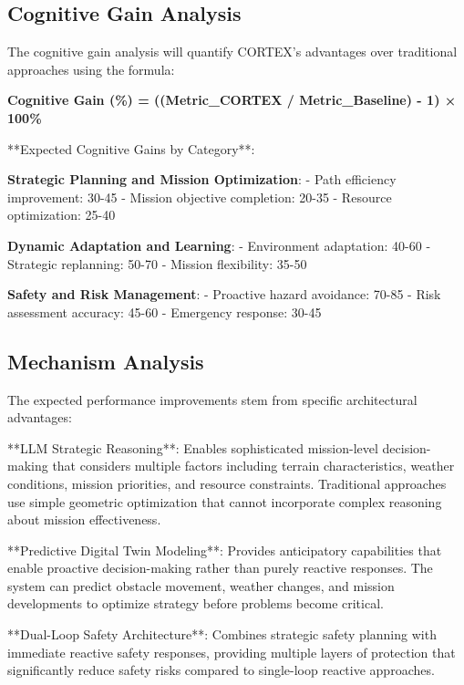 \subsection{Cognitive Gain Analysis}

The cognitive gain analysis will quantify CORTEX's advantages over traditional approaches using the formula:

\textbf{Cognitive Gain (\%) = ((Metric\_CORTEX / Metric\_Baseline) - 1) × 100\%}

**Expected Cognitive Gains by Category**:

\textbf{Strategic Planning and Mission Optimization}:
- Path efficiency improvement: 30-45%
- Mission objective completion: 20-35%
- Resource optimization: 25-40%

\textbf{Dynamic Adaptation and Learning}:
- Environment adaptation: 40-60%
- Strategic replanning: 50-70%
- Mission flexibility: 35-50%

\textbf{Safety and Risk Management}:
- Proactive hazard avoidance: 70-85%
- Risk assessment accuracy: 45-60%
- Emergency response: 30-45%

\subsection{Mechanism Analysis}

The expected performance improvements stem from specific architectural advantages:

**LLM Strategic Reasoning**: Enables sophisticated mission-level decision-making that considers multiple factors including terrain characteristics, weather conditions, mission priorities, and resource constraints. Traditional approaches use simple geometric optimization that cannot incorporate complex reasoning about mission effectiveness.

**Predictive Digital Twin Modeling**: Provides anticipatory capabilities that enable proactive decision-making rather than purely reactive responses. The system can predict obstacle movement, weather changes, and mission developments to optimize strategy before problems become critical.

**Dual-Loop Safety Architecture**: Combines strategic safety planning with immediate reactive safety responses, providing multiple layers of protection that significantly reduce safety risks compared to single-loop reactive approaches.

